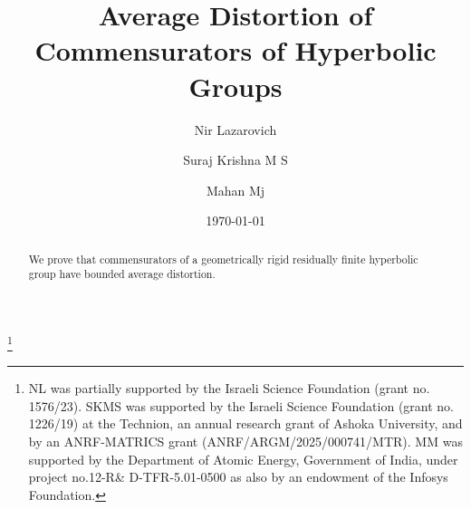 \documentclass{amsart}
\numberwithin{equation}{section}
\theoremstyle{definition}
\begin{document}
\title{Average Distortion of Commensurators of Hyperbolic Groups}



\author{Nir Lazarovich}

\address{Department of Mathematics
	Technion
	Haifa 32000
	Israel}
 
\author{Suraj Krishna M S}


\address{Department of Mathematics, Ashoka University
Rai Sonepat Haryana, 131029, India}









\author{Mahan Mj}



\address{School of Mathematics, Tata Institute of Fundamental Research, Mumbai-40005, India}
\date{\today}


\thanks{NL was partially supported by the Israeli Science Foundation (grant no. 1576/23). 
SKMS was supported by the Israeli Science Foundation (grant no. 1226/19) at the Technion, an annual research grant of Ashoka University, and by an ANRF-MATRICS grant (ANRF/ARGM/2025/000741/MTR).
MM was supported by the Department of Atomic Energy,
Government of India, under project no.12-R\& D-TFR-5.01-0500 as also by an endowment of the
Infosys Foundation.  }

\begin{abstract}
We prove that commensurators of a geometrically rigid residually finite hyperbolic group have bounded average distortion.
\end{abstract}


\maketitle




\end{document}
